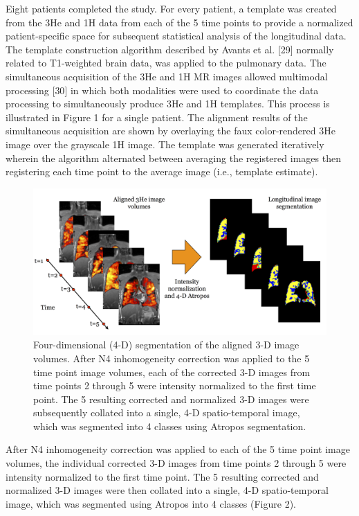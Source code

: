 \documentclass[11pt,]{article}
\begin{document}
Eight patients completed the study. For every patient, a template was
created from the 3He and 1H data from each of the 5 time points to
provide a normalized patient-specific space for subsequent statistical
analysis of the longitudinal data. The template construction algorithm
described by Avants et al. {[}29{]} normally related to T1-weighted
brain data, was applied to the pulmonary data. The simultaneous
acquisition of the 3He and 1H MR images allowed multimodal processing
{[}30{]} in which both modalities were used to coordinate the data
processing to simultaneously produce 3He and 1H templates. This process
is illustrated in Figure 1 for a single patient. The alignment results
of the simultaneous acquisition are shown by overlaying the faux
color-rendered 3He image over the grayscale 1H image. The template was
generated iteratively wherein the algorithm alternated between averaging
the registered images then registering each time point to the average
image (i.e., template estimate).

\begin{figure}[htbp]
\centering
\includegraphics{Figures/4dSegmentation.png}
\caption{Four-dimensional (4-D) segmentation of the aligned 3-D image
volumes. After N4 inhomogeneity correction was applied to the 5 time
point image volumes, each of the corrected 3-D images from time points 2
through 5 were intensity normalized to the first time point. The 5
resulting corrected and normalized 3-D images were subsequently collated
into a single, 4-D spatio-temporal image, which was segmented into 4
classes using Atropos segmentation.}
\end{figure}

After N4 inhomogeneity correction was applied to each of the 5 time
point image volumes, the individual corrected 3-D images from time
points 2 through 5 were intensity normalized to the first time point.
The 5 resulting corrected and normalized 3-D images were then collated
into a single, 4-D spatio-temporal image, which was segmented using
Atropos into 4 classes (Figure 2).
\end{document}
